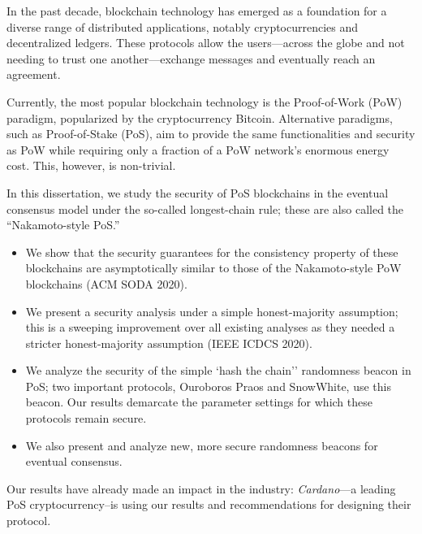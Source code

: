 
In the past decade, blockchain technology has emerged as a foundation for a diverse range of distributed applications, notably cryptocurrencies and decentralized ledgers. 
These protocols allow the users---across the globe and not 
needing to trust one another---exchange messages and eventually reach an agreement. 

 

Currently, the most popular blockchain technology is the Proof-of-Work (PoW) paradigm, popularized by the cryptocurrency Bitcoin. Alternative paradigms, such as Proof-of-Stake (PoS), aim to provide the same functionalities and security as PoW while requiring only a fraction of a PoW network's enormous energy cost. This, however, is non-trivial.

 

In this dissertation, we study the security of PoS blockchains in the eventual consensus model under the so-called longest-chain rule; 
these are also called the ``Nakamoto-style PoS.''
\begin{itemize}
  \item We show that the security guarantees 
  for the consistency property of these blockchains are asymptotically similar 
  to those of the Nakamoto-style PoW blockchains (ACM SODA 2020). 

  \item We present a security analysis under a simple honest-majority assumption; this is a sweeping improvement over all existing analyses as they needed a stricter honest-majority assumption (IEEE ICDCS 2020).

  \item We analyze the security of the simple `hash the chain'' randomness beacon 
  in PoS; two important protocols, Ouroboros Praos and SnowWhite, use this beacon. 
  Our results demarcate the parameter settings for which these protocols remain secure. 

  \item We also present and analyze new, more secure randomness beacons for eventual consensus.
\end{itemize}

Our results have already made an impact in the industry: \emph{Cardano}---a leading PoS cryptocurrency--is using our results and recommendations for designing their protocol.

